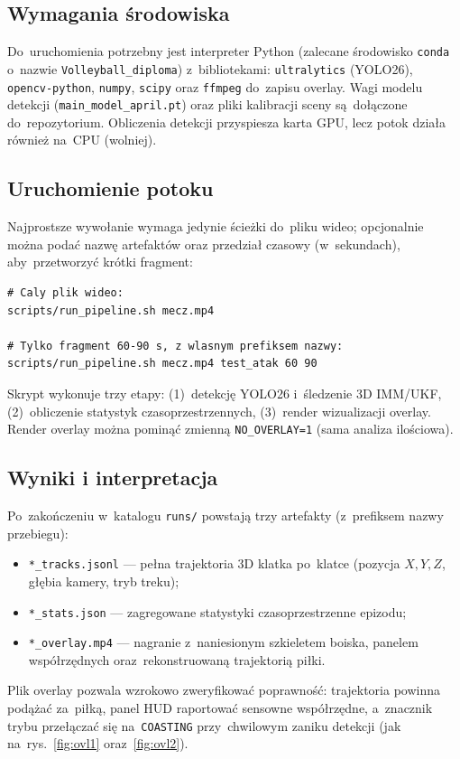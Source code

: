 \documentclass[14pt,a4paper]{extarticle}
\begin{document}
\subsection{Wymagania środowiska}
Do~uruchomienia potrzebny jest interpreter Python (zalecane środowisko \texttt{conda}
o~nazwie \texttt{Volleyball\_diploma}) z~bibliotekami: \texttt{ultralytics} (YOLO26),
\texttt{opencv-python}, \texttt{numpy}, \texttt{scipy} oraz \texttt{ffmpeg} do~zapisu
overlay. Wagi modelu detekcji (\texttt{main\_model\_april.pt}) oraz pliki kalibracji
sceny są~dołączone do~repozytorium. Obliczenia detekcji przyspiesza karta GPU, lecz
potok działa również na~CPU (wolniej).

\subsection{Uruchomienie potoku}
Najprostsze wywołanie wymaga jedynie ścieżki do~pliku wideo; opcjonalnie można podać
nazwę artefaktów oraz przedział czasowy (w~sekundach), aby~przetworzyć krótki fragment:
\begin{lstlisting}[style=sh]
# Caly plik wideo:
scripts/run_pipeline.sh mecz.mp4

# Tylko fragment 60-90 s, z wlasnym prefiksem nazwy:
scripts/run_pipeline.sh mecz.mp4 test_atak 60 90
\end{lstlisting}
Skrypt wykonuje trzy etapy: (1)~detekcję YOLO26 i~śledzenie 3D IMM/UKF, (2)~obliczenie
statystyk czasoprzestrzennych, (3)~render wizualizacji overlay. Render overlay można
pominąć zmienną \texttt{NO\_OVERLAY=1} (sama analiza ilościowa).

\subsection{Wyniki i interpretacja}
Po~zakończeniu w~katalogu \texttt{runs/} powstają trzy artefakty (z~prefiksem nazwy
przebiegu):
\begin{itemize}[leftmargin=1.4em, itemsep=2pt, topsep=2pt]
  \item \texttt{*\_tracks.jsonl} --- pełna trajektoria 3D klatka po~klatce (pozycja
        $X,Y,Z$, głębia kamery, tryb treku);
  \item \texttt{*\_stats.json} --- zagregowane statystyki czasoprzestrzenne epizodu;
  \item \texttt{*\_overlay.mp4} --- nagranie z~naniesionym szkieletem boiska, panelem
        współrzędnych oraz~rekonstruowaną trajektorią piłki.
\end{itemize}
Plik overlay pozwala wzrokowo zweryfikować poprawność: trajektoria powinna podążać za~piłką,
panel HUD raportować sensowne współrzędne, a~znacznik trybu przełączać się na~\texttt{COASTING}
przy~chwilowym zaniku detekcji (jak na~rys.~\ref{fig:ovl1} oraz~\ref{fig:ovl2}).
\end{document}
